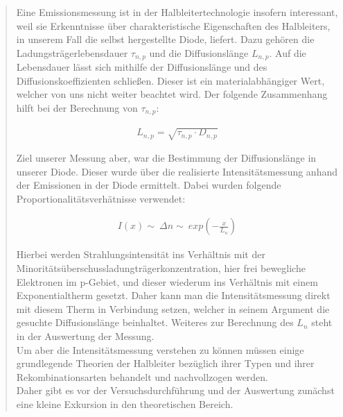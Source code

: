 \begin{quote}
    
    
    Eine Emissionsmessung ist in der Halbleitertechnologie insofern interessant,
    weil sie Erkenntnisse über charakteristische Eigenschaften des Halbleiters,
    in unserem Fall die selbst hergestellte Diode, liefert. Dazu gehören die
    Ladungsträgerlebensdauer $\tau_{n,p}$ und die Diffusionslänge $L_{n,p}$. Auf
    die Lebensdauer lässt sich mithilfe der Diffusionslänge und des
    Diffusionskoeffizienten schließen. Dieser ist ein materialabhängiger Wert,
    welcher von uns nicht weiter beachtet wird. Der folgende Zusammenhang hilft
    bei der Berechnung von $\tau_{n,p}$:
    
    \begin{equation*}
        \begin{split}
            L_{n,p} = \sqrt{\tau_{n,p} \cdot D_{n,p}} 
        \end{split}
    \end{equation*}
    
    Ziel unserer Messung aber, war die Bestimmung der Diffusionslänge in unserer
    Diode. Dieser wurde über die realisierte Intensitätsmessung anhand der
    Emissionen in der Diode ermittelt. Dabei wurden folgende
    Proportionalitätsverhätnisse verwendet:
    
    \begin{equation*}
        \begin{split}
            I(x) \sim \ \Delta n \sim \ exp(-\frac{x}{L_n}) 
        \end{split}
    \end{equation*}
    
    Hierbei werden Strahlungsintensität ins Verhältnis mit der\\
    Minoritätsüberschussladungträgerkonzentration, hier frei bewegliche
    Elektronen im p-Gebiet, und dieser wiederum ins Verhältnis mit einem
    Exponentialtherm gesetzt. Daher kann man die Intensitätsmessung direkt mit
    diesem Therm in Verbindung setzen, welcher in seinem Argument die gesuchte
    Diffusionslänge beinhaltet. Weiteres zur Berechnung des $L_n$ steht in der
    Auswertung der Messung.\\
    
    Um aber die Intensitätsmessung verstehen zu können müssen einige
    grundlegende Theorien der Halbleiter bezüglich ihrer Typen und ihrer
    Rekombinationsarten behandelt und nachvollzogen werden.\\ 
    Daher gibt es vor der Versuchsdurchführung und der Auswertung zunächst eine
    kleine Exkursion in den theoretischen Bereich.
    

\end{quote}
